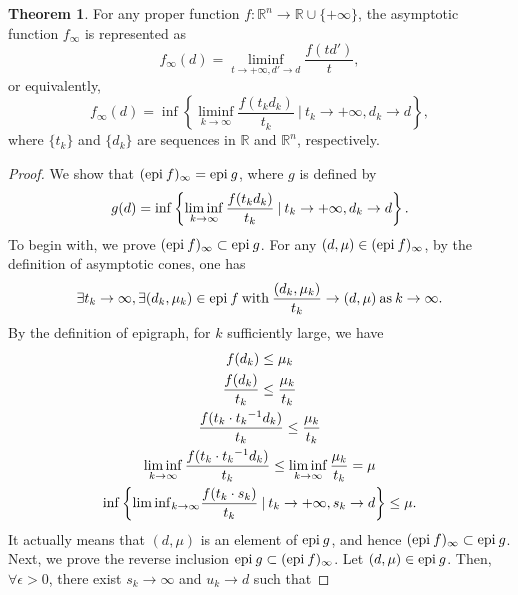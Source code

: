 \documentclass[a4paper,11pt, oneside]{book}
\theoremstyle{definition}
\newtheorem{thm}[dfn]{Theorem}
\newcommand{\RealNumberSet}{\mathbb{R}}
\newcommand{\NDemenstionalRealEuclideanSpace}{\mathbb{R}^n}
\newcommand{\Epigraph}[1]{\text{\rm epi\:${#1}$}} %
\newcommand{\ExtendedRealValuedFunction}[2]{{#1}: {#2} \to \RealNumberSet \cup \{+\infty\}}
\begin{document}
\begin{thm}
  For any proper function $\ExtendedRealValuedFunction{f}{\NDemenstionalRealEuclideanSpace}$, the asymptotic function $f_{\infty}$ is represented as
  \begin{equation}
    f_{\infty}(d) = \liminf_{t \to +\infty, d' \to d} \frac{f(td')}{t},
  \end{equation}
  or equivalently,
  \begin{equation}
    f_{\infty}(d) = \inf \left\{ \liminf_{k \to \infty} \frac{f(t_k d_k)}{t_k} \:|\: t_k \to +\infty, d_k \to d \right\},
  \end{equation}
  where $\{t_k\}$ and $\{d_k\}$ are sequences in $\RealNumberSet$ and  $\NDemenstionalRealEuclideanSpace$, respectively.
\end{thm}

\begin{proof}
  We show that $(\Epigraph{f})_{\infty} = \Epigraph{g}$, where $g$ is defined by
  \begin{equation}
    g(d) = \inf \left\{ \liminf_{k \to \infty} \frac{f(t_k d_k)}{t_k} \:|\: t_k \to +\infty, d_k \to d \right\}. \notag
  \end{equation}
  To begin with, we prove $(\Epigraph{f})_{\infty} \subset \Epigraph{g}$. For any $(d, \mu) \in (\Epigraph{f})_{\infty}$, by the definition of asymptotic cones, one has
  \begin{equation}
    \exists t_k \to \infty, \exists (d_k, \mu_k) \in \Epigraph{f} \:\text{with}\: \frac{(d_k, \mu_k)}{t_k} \to (d, \mu) \:\text{as}\: k \to \infty. \notag
  \end{equation}
  By the definition of epigraph, for $k$ sufficiently large, we have
  \begin{gather}
    f(d_k) \leq \mu_k \notag\\
    \frac{f(d_k)}{t_k} \leq \frac{\mu_k}{t_k} \notag\\
    \frac{f(t_k \cdot {t_k}^{-1}d_k)}{t_k} \leq \frac{\mu_k}{t_k} \notag\\
    \liminf_{k \to \infty} \frac{f(t_k \cdot {t_k}^{-1}d_k)}{t_k} \leq \liminf_{k \to \infty} \frac{\mu_k}{t_k} = \mu \notag \\
    \inf \left\{ {\liminf}_{k \to \infty} \frac{f(t_k \cdot s_k)}{t_k} \:|\: t_k \to +\infty, s_k \to d \right\}\leq \mu. \notag
  \end{gather}
  It actually means that $(d, \mu)$ is an element of $\Epigraph{g}$, and hence $(\Epigraph{f})_{\infty} \subset \Epigraph{g}$. \\
  Next, we prove the reverse inclusion $\Epigraph{g} \subset (\Epigraph{f})_{\infty}$. Let $(d, \mu) \in \Epigraph{g}$. Then, $\forall \epsilon > 0$, there exist $s_k \to \infty$ and $u_k \to d$ such that

\end{proof}
\end{document}
